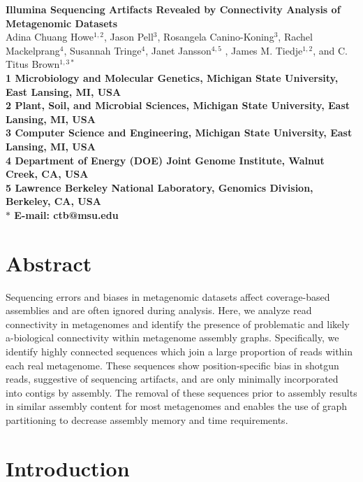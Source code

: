 \documentclass[10pt]{article}
\date{}
\begin{document}
\begin{flushleft}
{\Large \textbf{Illumina Sequencing Artifacts Revealed by Connectivity
    Analysis of Metagenomic Datasets} }
\\
Adina Chuang Howe$^{1,2}$, 
Jason Pell$^{3}$,
Rosangela Canino-Koning$^{3}$,
Rachel Mackelprang$^{4}$,
Susannah Tringe$^{4}$,
Janet Jansson$^{4,5}$ ,
James M. Tiedje$^{1,2}$, and 
C. Titus Brown$^{1,3\ast}$
\\
\bf{1} Microbiology and Molecular Genetics, Michigan State University, East Lansing, MI, USA
\\
\bf{2} Plant, Soil, and Microbial Sciences, Michigan State University, East Lansing, MI, USA
\\
\bf{3} Computer Science and Engineering, Michigan State University, East Lansing, MI, USA
\\
\bf{4} Department of Energy (DOE) Joint Genome Institute, Walnut Creek, CA, USA
\\
\bf{5} Lawrence Berkeley National Laboratory, Genomics Division, Berkeley, CA, USA
\\
$\ast$ E-mail: ctb@msu.edu
\end{flushleft}

\section*{Abstract}

Sequencing errors and biases in metagenomic datasets affect
coverage-based assemblies and are often ignored during analysis.
Here, we analyze read connectivity in metagenomes and identify the
presence of problematic and likely a-biological connectivity within
metagenome assembly graphs.  Specifically, we identify highly
connected sequences which join a large proportion of reads within each
real metagenome.  These sequences show position-specific bias in
shotgun reads, suggestive of sequencing artifacts, and are only
minimally incorporated into contigs by assembly.  The removal of these
sequences prior to assembly results in similar assembly content for
most metagenomes and enables the use of graph partitioning to
decrease assembly memory and time requirements.

\section*{Introduction}
\end{document}
